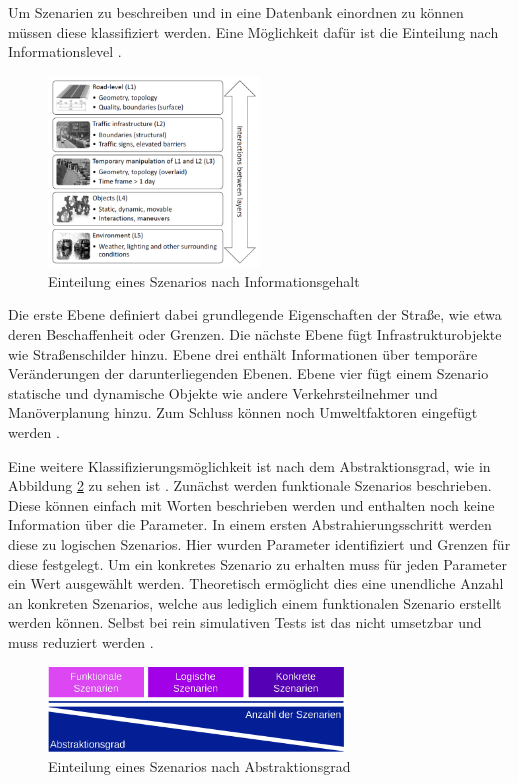 Um Szenarien zu beschreiben und in eine Datenbank einordnen zu können müssen diese klassifiziert werden. Eine Möglichkeit dafür ist die Einteilung nach Informationslevel \cite{Nalic2020}\cite{Bagschik2018}.
\begin{figure}[H]
    \centering
    \includegraphics[width=0.5\textwidth]{figures/2_Grundlagen/layer_model.png}
    \caption{Einteilung eines Szenarios nach Informationsgehalt \cite{Bagschik2018}}
    \label{fig:layer_model}
\end{figure}
Die erste Ebene definiert dabei grundlegende Eigenschaften der Straße, wie etwa deren Beschaffenheit oder Grenzen. Die nächste Ebene fügt Infrastrukturobjekte wie Straßenschilder hinzu. Ebene drei enthält Informationen über temporäre Veränderungen der darunterliegenden Ebenen. Ebene vier fügt einem Szenario statische und dynamische Objekte wie andere Verkehrsteilnehmer und Manöverplanung hinzu. Zum Schluss können noch Umweltfaktoren eingefügt werden \cite{Bagschik2018}.

Eine weitere Klassifizierungsmöglichkeit ist nach dem Abstraktionsgrad, wie in Abbildung \ref{fig:scenario_level} zu sehen ist \cite{Nalic2020}\cite{menzel2018scenarios}. Zunächst werden funktionale Szenarios beschrieben. Diese können einfach mit Worten beschrieben werden und enthalten noch keine Information über die Parameter. In einem ersten Abstrahierungsschritt werden diese zu logischen Szenarios. Hier wurden Parameter identifiziert und Grenzen für diese festgelegt. Um ein konkretes Szenario zu erhalten muss für jeden Parameter ein Wert ausgewählt werden. Theoretisch ermöglicht dies eine unendliche Anzahl an konkreten Szenarios, welche aus lediglich einem funktionalen Szenario erstellt werden können. Selbst bei rein simulativen Tests ist das nicht umsetzbar und muss reduziert werden \cite{menzel2018scenarios}.
\begin{figure}
    \centering
    \includegraphics[width=0.7\textwidth]{figures/2_Grundlagen/scenario_level.pdf}
    \caption{Einteilung eines Szenarios nach Abstraktionsgrad \cite{menzel2018scenarios}}
    \label{fig:scenario_level}
\end{figure}

